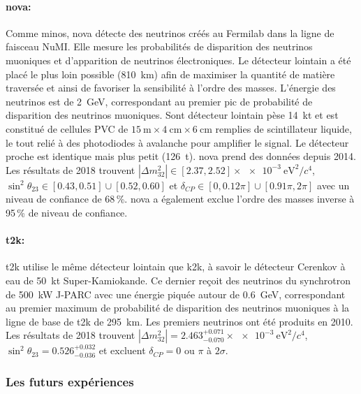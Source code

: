         \paragraph{\texorpdfstring{\gls{nova}}{NOVA}\cite{Acero2018}:} Comme \gls{minos}, \gls{nova} détecte des neutrinos créés au Fermilab dans la ligne de faisceau NuMI. Elle mesure les probabilités de disparition des neutrinos muoniques et d'apparition de neutrinos électroniques. Le détecteur lointain a été placé le plus loin possible (\SI{810}{\kilo\meter}) afin de maximiser la quantité de matière traversée et ainsi de favoriser la sensibilité à l'ordre des masses. L'énergie des neutrinos est de \SI{2}{\giga\electronvolt}, correspondant au premier pic de probabilité de disparition des neutrinos muoniques. Sont détecteur lointain pèse \SI{14}{\kilo\tonne} et est constitué de  cellules PVC de $\SI{15}{\meter}\times\SI{4}{\centi\meter}\times\SI{6}{\centi\meter}$ remplies de scintillateur liquide, le tout relié à des photodiodes à avalanche pour amplifier le signal. Le détecteur proche est identique mais plus petit (\SI{126}{\tonne}). \gls{nova} prend des données depuis 2014. Les résultats de 2018\cite{Acero2018} trouvent $|\Delta m_{32}^2|\in[2.37, 2.52]\times\SI{e-3}{\electronvolt\squared\per c^4}$, $\sin^2{\theta_{23}}\in [0.43, 0.51]\cup[0.52, 0.60]$ et $\delta_{CP}\in[0, 0.12\pi]\cup[0.91\pi, 2\pi]$ avec un niveau de confiance de 68\,\%. \gls{nova} a également exclue l'ordre des masses inverse à 95\,\% de niveau de confiance.
        
        \paragraph{\gls{t2k}\cite{Abe2018}:} \gls{t2k} utilise le même détecteur lointain que \gls{k2k}, à savoir le détecteur Cerenkov à eau de \SI{50}{\kilo\tonne} Super-Kamiokande. Ce dernier reçoit des neutrinos du synchrotron de \SI{500}{\kilo\watt} J-PARC avec une énergie piquée autour de \SI{0.6}{\giga\electronvolt}, correspondant au premier maximum de probabilité de disparition des neutrinos muoniques à la ligne de base de \gls{t2k} de \SI{295}{\kilo\meter}. Les premiers neutrinos ont été produits en 2010. Les résultats de 2018\cite{Abe2018} trouvent $|\Delta m_{32}^2|=2.463^{+0.071}_{-0.070}\times\SI{e-3}{\electronvolt\squared\per c^4}$, $\sin^2{\theta_{23}}=0.526^{+0.032}_{-0.036}$ et excluent $\delta_{CP}=0$ ou $\pi$ à $2\sigma$.

      \subsubsection{Les futurs expériences}

